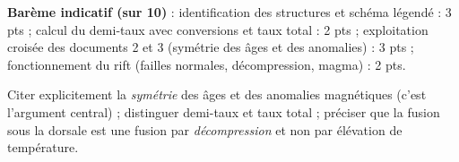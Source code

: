 \documentclass[11pt]{article}
\begin{document}
\begin{corrige}
\begin{enumerate}
\end{enumerate}
\textbf{Barème indicatif (sur 10)} : identification des structures et schéma légendé : 3 pts ; calcul du demi-taux avec conversions et taux total : 2 pts ; exploitation croisée des documents 2 et 3 (symétrie des âges et des anomalies) : 3 pts ; fonctionnement du rift (failles normales, décompression, magma) : 2 pts.
\end{corrige}

\begin{attention}
Citer explicitement la \emph{symétrie} des âges et des anomalies magnétiques (c'est l'argument central) ; distinguer demi-taux et taux total ; préciser que la fusion sous la dorsale est une fusion par \emph{décompression} et non par élévation de température.
\end{attention}
\end{document}
